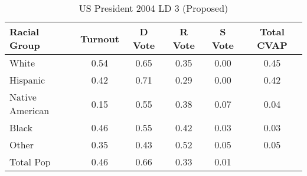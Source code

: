 \begin{table}[htb]
\begin{center}
\caption{US President 2004 LD 3 (Proposed)}
\label{pres04_cvap_ld_3}
\begin{tabular}{lccccc}
  \hline
Racial Group & Turnout & D Vote & R Vote & S Vote & Total CVAP \\ 
  \hline
White & 0.54 & 0.65 & 0.35 & 0.00 & 0.45 \\ 
  Hispanic & 0.42 & 0.71 & 0.29 & 0.00 & 0.42 \\ 
  Native American & 0.15 & 0.55 & 0.38 & 0.07 & 0.04 \\ 
  Black & 0.46 & 0.55 & 0.42 & 0.03 & 0.03 \\ 
  Other & 0.35 & 0.43 & 0.52 & 0.05 & 0.05 \\ 
  Total Pop & 0.46 & 0.66 & 0.33 & 0.01 &  \\ 
   \hline
\end{tabular}
\end{center}
\end{table}
